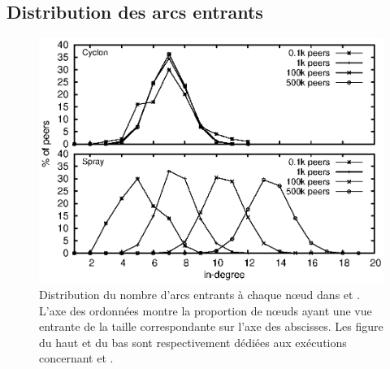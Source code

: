 \subsection{Distribution des arcs entrants}
\label{net:subsec:inview}

\begin{figure}
  \centering
  \includegraphics[width=.8\textwidth]{img/spray/histo.eps}
  \caption{\label{net:fig:inview} Distribution du nombre d'arcs entrants à
    chaque nœud dans \CYCLON et \SPRAY. L'axe des ordonnées montre la proportion
    de nœuds ayant une vue entrante de la taille correspondante sur l'axe des
    abscisses. Les figure du haut et du bas sont respectivement dédiées aux
    exécutions concernant \CYCLON et \SPRAY.}
\end{figure}


